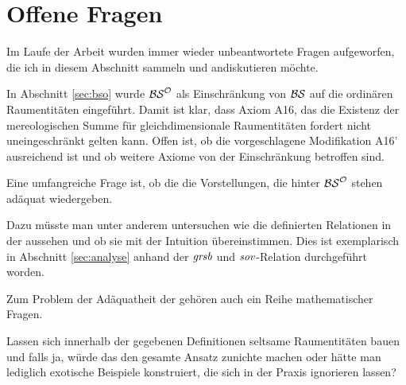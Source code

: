 
    \section{Offene Fragen}\label{sec:offene-fragen} %
    Im Laufe der Arbeit wurden immer wieder unbeantwortete Fragen aufgeworfen, die ich in diesem Abschnitt sammeln und andiskutieren möchte.
    
    
    In
    \marginpar{$\theoryBSO$}
    Abschnitt \ref{sec:bso} wurde $\theoryBSO$ als Einschränkung von $\mathcal{BS}$ auf die ordinären Raumentitäten eingeführt. Damit ist klar, dass Axiom A16, das die Existenz der mereologischen Summe für gleichdimensionale Raumentitäten fordert nicht uneingeschränkt gelten kann. Offen ist, ob die vorgeschlagene Modifikation A16' ausreichend ist und ob weitere Axiome von der Einschränkung betroffen sind.
    
    Eine umfangreiche Frage ist, ob die \strukt die Vorstellungen, die hinter $\theoryBSO$ stehen adäquat wiedergeben.
    
    Dazu
    müsste man unter anderem untersuchen wie die definierten Relationen in der \strukt aussehen und ob sie mit der Intuition übereinstimmen. 
    Dies ist exemplarisch in Abschnitt \ref{sec:analyse} anhand der $\mathit{gr\hspace*{-0.25ex}sb}$ und $\mathit{sov}$-Relation durchgeführt worden.
    
    Zum Problem der Adäquatheit der \strukt gehören auch ein Reihe mathematischer Fragen.
    
    
    Lassen
    sich innerhalb der gegebenen Definitionen seltsame Raumentitäten bauen und falls ja, würde das den gesamte Ansatz zunichte machen oder hätte man lediglich exotische Beispiele konstruiert, die sich in der Praxis ignorieren lassen?
    
